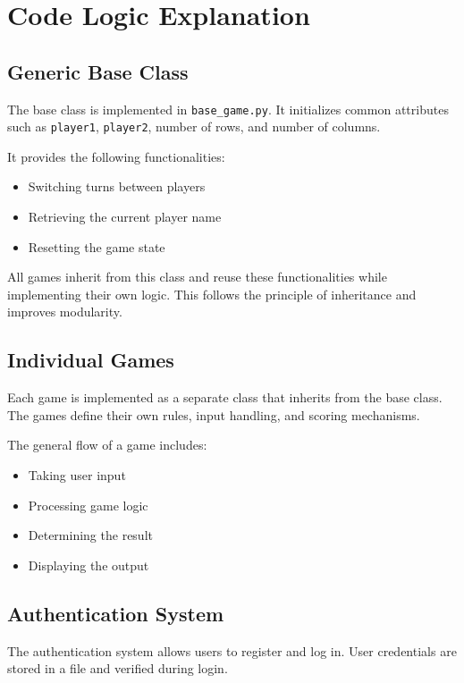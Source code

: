 \documentclass{article}
\begin{document}
\section{Code Logic Explanation}

\subsection{Generic Base Class}

The base class is implemented in \texttt{base\_game.py}. It initializes common attributes such as \texttt{player1}, \texttt{player2}, number of rows, and number of columns.

It provides the following functionalities:
\begin{itemize}
\item Switching turns between players
\item Retrieving the current player name
\item Resetting the game state
\end{itemize}

All games inherit from this class and reuse these functionalities while implementing their own logic. This follows the principle of inheritance and improves modularity.

\subsection{Individual Games}

Each game is implemented as a separate class that inherits from the base class. The games define their own rules, input handling, and scoring mechanisms.

The general flow of a game includes:
\begin{itemize}
\item Taking user input
\item Processing game logic
\item Determining the result
\item Displaying the output
\end{itemize}

\subsection{Authentication System}

The authentication system allows users to register and log in. User credentials are stored in a file and verified during login.
\end{document}
